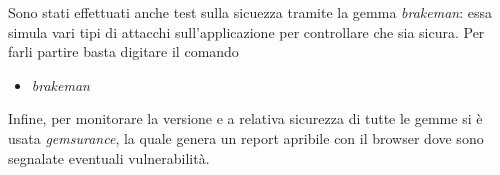 \documentclass[Lau, binding=0.6cm, oneside]{sapthesis}
\begin{document}
Sono stati effettuati anche test sulla sicuezza tramite la gemma \textit{brakeman}: essa simula vari tipi di attacchi sull'applicazione per controllare che sia sicura. Per farli partire basta digitare il comando 
\begin{itemize}
	\item \textit{brakeman}
\end{itemize}

Infine, per monitorare la versione e a relativa sicurezza di tutte le gemme si è usata \textit{gemsurance}, la quale genera un report apribile con il browser dove sono segnalate eventuali vulnerabilità. 

\backmatter
\cleardoublepage
\nocite{*}
\end{document}
